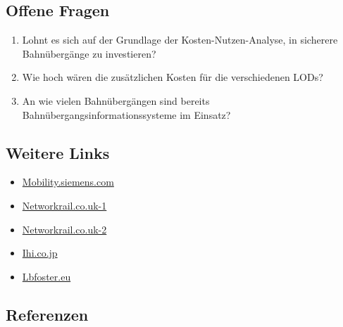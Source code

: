 \documentclass[
]{book}
\providecommand{\tightlist}{%
  \setlength{\itemsep}{0pt}\setlength{\parskip}{0pt}}
\begin{document}
\hypertarget{offene-fragen-2}{%
\subsection*{Offene Fragen}\label{offene-fragen-2}}

\begin{enumerate}
\def\labelenumi{\arabic{enumi}.}
\tightlist
\item
  Lohnt es sich auf der Grundlage der Kosten-Nutzen-Analyse, in sicherere Bahnübergänge zu investieren?
\item
  Wie hoch wären die zusätzlichen Kosten für die verschiedenen LODs?
\item
  An wie vielen Bahnübergängen sind bereits Bahnübergangsinformationssysteme im Einsatz?
\end{enumerate}

\hypertarget{weitere-links-1}{%
\subsection*{Weitere Links}\label{weitere-links-1}}

\begin{itemize}
\tightlist
\item
  \href{https://www.mobility.siemens.com/global/en/portfolio/rail/automation/signaling-on-board-and-crossing-products/crossings-overview/crossings-protection.html}{Mobility.siemens.com}
\item
  \href{https://www.networkrail.co.uk/communities/safety-in-the-community/railway-safety-campaigns/}{Networkrail.co.uk-1}
\item
  \href{https://www.networkrail.co.uk/communities/safety-in-the-community/level-crossing-safety/}{Networkrail.co.uk-2}
\item
  \href{https://www.ihi.co.jp/3DLaserRadar/en/products/01.html}{Ihi.co.jp}
\item
  \href{https://lbfoster.eu/en/control-and-display/solutions/remote-condition-monitoring/lidar-level-crossing-obstacle-detection/}{Lbfoster.eu}
\end{itemize}

\hypertarget{referenzen-2}{%
\subsection*{Referenzen}\label{referenzen-2}}
\end{document}
